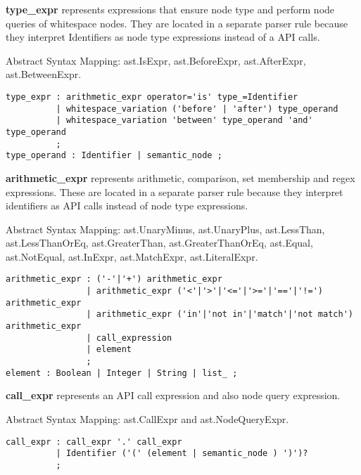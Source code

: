 \documentclass[parskip=full]{uvamscse}
\begin{document}
\begin{description}
\item\textbf{type\_expr} represents expressions that ensure node type and perform node queries of whitespace nodes. They are located in a separate parser rule because they interpret Identifiers as node type expressions instead of a API calls. 

Abstract Syntax Mapping: ast.IsExpr, ast.BeforeExpr, ast.AfterExpr, ast.BetweenExpr.

\begin{snippet}
\begin{verbatim}
type_expr : arithmetic_expr operator='is' type_=Identifier
          | whitespace_variation ('before' | 'after') type_operand
          | whitespace_variation 'between' type_operand 'and' type_operand
          ;
type_operand : Identifier | semantic_node ;
\end{verbatim}
\end{snippet}

\item\textbf{arithmetic\_expr} represents arithmetic, comparison, set membership and regex expressions. These are located in a separate parser rule because they interpret identifiers as API calls instead of node type expressions.

Abstract Syntax Mapping: ast.UnaryMinus, ast.UnaryPlus, ast.LessThan, ast.LessThanOrEq, ast.GreaterThan, ast.GreaterThanOrEq, ast.Equal, ast.NotEqual, ast.InExpr, ast.MatchExpr, ast.LiteralExpr.

\begin{snippet}
\begin{verbatim}
arithmetic_expr : ('-'|'+') arithmetic_expr
                | arithmetic_expr ('<'|'>'|'<='|'>='|'=='|'!=') arithmetic_expr
                | arithmetic_expr ('in'|'not in'|'match'|'not match') arithmetic_expr
                | call_expression
                | element
                ;
element : Boolean | Integer | String | list_ ;
\end{verbatim}
\end{snippet}

\item\textbf{call\_expr} represents an API call expression and also node query expression.

Abstract Syntax Mapping: ast.CallExpr and ast.NodeQueryExpr.

\begin{snippet}
\begin{verbatim}
call_expr : call_expr '.' call_expr
          | Identifier ('(' (element | semantic_node ) ')')? 
          ;
\end{verbatim}
\end{snippet}


\end{description}
\end{document}
